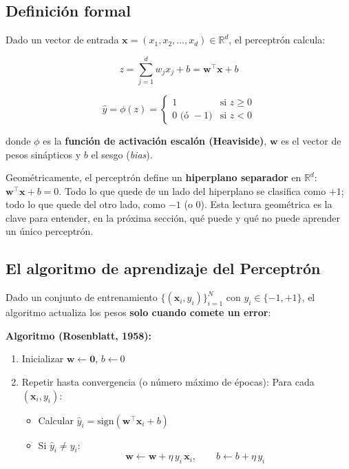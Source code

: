 \documentclass[
  letterpaper,
  DIV=11,
  numbers=noendperiod]{scrartcl}
\providecommand{\tightlist}{%
  \setlength{\itemsep}{0pt}\setlength{\parskip}{0pt}}
\begin{document}
\subsection{Definición formal}\label{definiciuxf3n-formal}

Dado un vector de entrada
\(\mathbf{x} = (x_1, x_2, \dots, x_d) \in \mathbb{R}^d\), el perceptrón
calcula:

\[
z = \sum_{j=1}^{d} w_j x_j + b = \mathbf{w}^\top \mathbf{x} + b
\]

\[
\hat{y} = \phi(z) = 
\begin{cases}
1 & \text{si } z \geq 0 \\
0 \text{ (ó } -1) & \text{si } z < 0
\end{cases}
\]

donde \(\phi\) es la \textbf{función de activación escalón (Heaviside)},
\(\mathbf{w}\) es el vector de pesos sinápticos y \(b\) el sesgo
(\emph{bias}).

Geométricamente, el perceptrón define un \textbf{hiperplano separador}
en \(\mathbb{R}^d\): \(\mathbf{w}^\top \mathbf{x} + b = 0\). Todo lo que
quede de un lado del hiperplano se clasifica como \(+1\); todo lo que
quede del otro lado, como \(-1\) (o \(0\)). Esta lectura geométrica es
la clave para entender, en la próxima sección, qué puede y qué no puede
aprender un único perceptrón.

\subsection{El algoritmo de aprendizaje del
Perceptrón}\label{el-algoritmo-de-aprendizaje-del-perceptruxf3n}

Dado un conjunto de entrenamiento \(\{(\mathbf{x}_i, y_i)\}_{i=1}^N\)
con \(y_i \in \{-1, +1\}\), el algoritmo actualiza los pesos
\textbf{solo cuando comete un error}:

\textbf{Algoritmo (Rosenblatt, 1958):}

\begin{enumerate}
\def\labelenumi{\arabic{enumi}.}
\tightlist
\item
  Inicializar \(\mathbf{w} \leftarrow \mathbf{0}\), \(b \leftarrow 0\)
\item
  Repetir hasta convergencia (o número máximo de épocas): Para cada
  \((\mathbf{x}_i, y_i)\):

  \begin{itemize}
  \tightlist
  \item
    Calcular
    \(\hat{y}_i = \text{sign}(\mathbf{w}^\top \mathbf{x}_i + b)\)
  \item
    Si \(\hat{y}_i \neq y_i\): \[
    \mathbf{w} \leftarrow \mathbf{w} + \eta \, y_i \, \mathbf{x}_i, \qquad b \leftarrow b + \eta \, y_i
    \]
  \end{itemize}
\end{enumerate}
\end{document}
